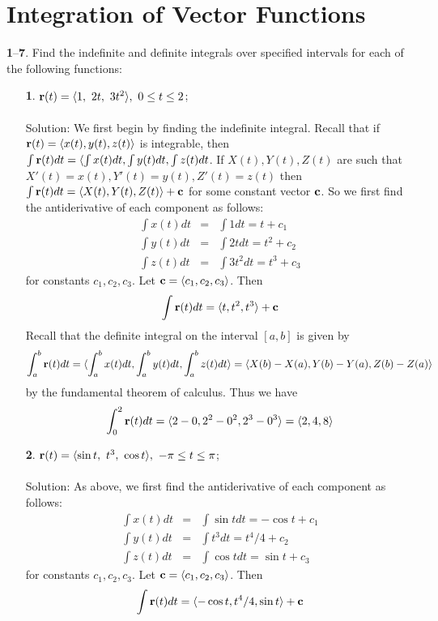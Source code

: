 \documentclass[12pt]{amsbook}
\newcommand{\la}{\langle}
\newcommand{\ra}{\rangle}
\begin{document}
\newpage
\section{Integration of Vector Functions}

\noindent
{\small {\bf 1}--{\bf 7}}. Find the indefinite and definite integrals over specified intervals for
each of the following functions:
\begin{enumerate}
  \item[{\small\bf 1}.] ${\bf r}(t)=\la 1,\ 2t,\ 3t^2 \ra, \ 0\leq t \leq 2$;
  \\
  \\
  {\sc Solution}: We first begin by finding the indefinite integral. Recall that if ${\bf r}(t)=\la x(t),y(t),z(t)\ra$ is integrable, then $\int {\bf r}(t)dt = \la \int x(t)dt, \int y(t)dt, \int z(t)dt$. If $X(t),Y(t),Z(t)$ are such that $X'(t)=x(t), Y'(t)=y(t), Z'(t)=z(t)$ then $\int {\bf r}(t)dt=\la X(t),Y(t),Z(t)\ra + {\bf c}$ for some constant vector ${\bf c}$. So we first find the antiderivative of each component as follows:
  \begin{eqnarray*}
  \int x(t)dt&=&\int 1 dt = t+c_1 \\
  \int y(t)dt&=&\int 2t dt = t^2+c_2 \\
  \int z(t)dt&=&\int 3t^2 dt = t^3+c_3 
  \end{eqnarray*}
  for constants $c_1,c_2,c_3$. Let ${\bf c}=\la c_1,c_2,c_3\ra$. Then 
  $$\int {\bf r}(t)dt=\la t,t^2,t^3\ra + {\bf c}$$
  Recall that the definite integral on the interval $[a,b]$ is given by
  $$\int_a^b {\bf r}(t)dt=\la \int_a^b x(t)dt,\int_a^b y(t)dt,\int_a^b z(t)dt \ra = \la X(b)-X(a), Y(b)-Y(a), Z(b)-Z(a)\ra$$
  by the fundamental theorem of calculus. 
  Thus we have
  $$\int_0^2 {\bf r}(t)dt=\la 2-0, 2^2-0^2, 2^3-0^3 \ra = \la 2,4,8 \ra$$
  \item[{\small\bf 2}.] ${\bf r}(t)=\la \sin t,\ t^3,\ \cos t\ra, \ -\pi \leq t \leq \pi $;
  \\
  \\
  {\sc Solution}: As above, we first find the antiderivative of each component as follows:
  \begin{eqnarray*}
  \int x(t)dt&=&\int \sin t dt = -\cos t+c_1 \\
  \int y(t)dt&=&\int t^3 dt = t^4/4+c_2 \\
  \int z(t)dt&=&\int \cos t dt = \sin t+c_3 
  \end{eqnarray*}
  for constants $c_1,c_2,c_3$. Let ${\bf c}=\la c_1,c_2,c_3\ra$. Then 
  $$\int {\bf r}(t)dt=\la -\cos t,t^4/4,\sin t\ra + {\bf c}$$

\end{enumerate}
\end{document}
